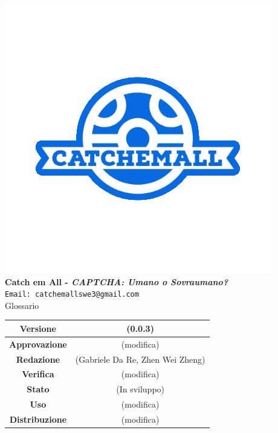 \begin{titlepage}
\begin{center}
		\includegraphics[scale = 1.5]{img/logo.png}\\
		\bigskip
		\large \textbf{Catch em All - \textit{CAPTCHA: Umano o Sovraumano?}}\\
		\texttt{Email: catchemallswe3@gmail.com}\\
		\vfill
		{\fontsize{1.5cm}{0}\selectfont Glossario}\\
		\vfill
		\renewcommand\tabularxcolumn[1]{>{\Centering}m{#1}}
		\begin{tabularx}{\textwidth}{|c|c|}
			\hline
			\textbf{Versione}      & (0.0.3)                                          \\
			\hline
			\textbf{Approvazione}  & (modifica)                                       \\
			\hline
			\textbf{Redazione}     & (Gabriele Da Re, Zhen Wei Zheng) \\
			\hline
			\textbf{Verifica}      & (modifica)                                       \\
			\hline
			\textbf{Stato}         & (In sviluppo)                                    \\
			\hline
			\textbf{Uso}           & (modifica)                                       \\
			\hline
			\textbf{Distribuzione} & (modifica)                                       \\
			\hline
		\end{tabularx}
	\end{center}
\end{titlepage}